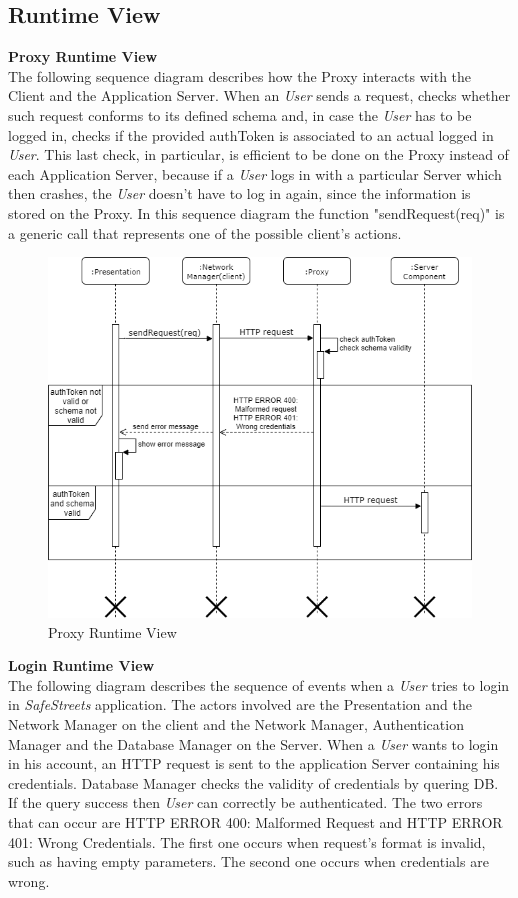 \documentclass{article}
\begin{document}
\clearpage

\subsection{Runtime View}
\textbf{Proxy Runtime View}\\
The following sequence diagram describes how the Proxy interacts with the Client and the Application 
Server. When an \textit{User} sends a request, checks whether such request conforms to its defined schema and, 
in case the \textit{User} has to be logged in, checks if the provided authToken is associated to an actual 
logged in \textit{User}. This last check, in particular, is efficient to be done on the Proxy instead of each 
Application Server, because if a \textit{User} logs in with a particular Server which then crashes, the 
\textit{User} doesn't have to log in again, since the information is stored on the Proxy. In this sequence diagram
the function "sendRequest(req)" is a generic call that represents one of the possible client's actions.

\begin{figure}[H]
    \centering
    \includegraphics[scale=0.4]{img/sequence_diagrams/Proxy_sequence.png}
    \caption{Proxy Runtime View}
\end{figure}  
\clearpage
\textbf{Login Runtime View}\\
The following diagram describes the sequence of events when a \textit{User} tries to login in 
\textit{SafeStreets} application. The actors involved are the Presentation and the Network Manager on the
client and the Network Manager, Authentication Manager and the Database Manager on the Server.
When a \textit{User} wants to login in his account, an HTTP request is sent to the application Server
containing his credentials. Database Manager checks the validity of credentials by quering DB. If the query
success then \textit{User} can correctly be authenticated. The two errors that can occur are HTTP ERROR 400:
Malformed Request and HTTP ERROR 401: Wrong Credentials. The first one occurs when request's format is invalid,
such as having empty parameters. The second one occurs when credentials are wrong.   
\end{document}
